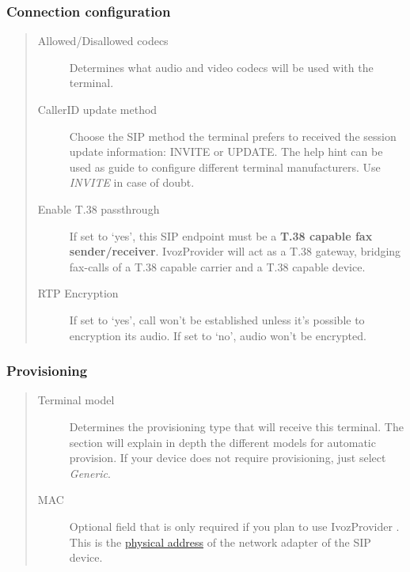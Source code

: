 \documentclass[letterpaper,10pt,spanish]{sphinxmanual}
\begin{document}
\subsubsection{Connection configuration}
\label{administration_portal/client/vpbx/terminals:connection-configuration}\begin{quote}
\begin{description}
\item[{Allowed/Disallowed codecs}] \leavevmode
Determines what audio and video codecs will be used with the terminal.

\item[{CallerID update method}] \leavevmode
Choose the SIP method the terminal prefers to received the session
update information: INVITE or UPDATE. The help hint can be used as
guide to configure different terminal manufacturers. Use \emph{INVITE} in
case of doubt.

\item[{Enable T.38 passthrough}] \leavevmode
If set to `yes', this SIP endpoint must be a \textbf{T.38 capable fax sender/receiver}. IvozProvider
will act as a T.38 gateway, bridging fax-calls of a T.38 capable carrier and a T.38 capable device.

\item[{RTP Encryption}] \leavevmode
If set to `yes', call won't be established unless it's possible to encryption its audio. If set to `no',
audio won't be encrypted.

\end{description}
\end{quote}


\subsubsection{Provisioning}
\label{administration_portal/client/vpbx/terminals:provisioning}\begin{quote}
\begin{description}
\item[{Terminal model}] \leavevmode
Determines the provisioning type that will receive this terminal.
The section {\hyperref[administration_portal/platform/terminal_manufacturers:provisioning]{}} will explain
in depth the different models for automatic provision. If your device
does not require provisioning, just select \emph{Generic}.

\item[{MAC}] \leavevmode
Optional field that is only required if you plan to use IvozProvider
{\hyperref[administration_portal/platform/terminal_manufacturers:provisioning]{}}. This is the \href{https://wikipedia.org/wiki/MAC\_Address}{physical
address} of the network
adapter of the SIP device.

\end{description}
\end{quote}
\end{document}
